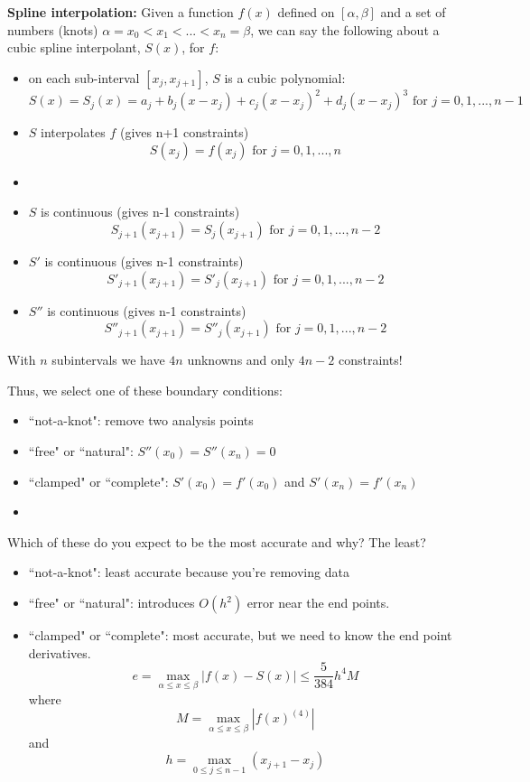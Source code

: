 \documentclass[12pt, answers]{exam}
\begin{document}
\textbf{Spline interpolation:} Given a function $f(x)$ defined on $[\alpha, \beta]$ and a set of numbers (knots) $\alpha=x_0 < x_1 < ... < x_n = \beta$, we can say the following about a cubic spline interpolant, $S(x)$, for $f$:
%
\begin{itemize}
\item on each sub-interval $[x_j, x_{j+1}]$, $S$ is a cubic polynomial:
\[S(x) = S_j(x) = a_j + b_j(x-x_j) + c_j(x-x_j)^2 + d_j(x-x_j)^3 \text{ for } j = 0, 1, ..., n-1\]

\ifprintanswers
\item $S$ interpolates $f$ (gives n+1 constraints)
\[S(x_j) = f(x_j)\text{ for } j = 0, 1, ..., n\]
\else
\item
 \vspace*{3em}
\fi

\item $S$ is continuous (gives n-1 constraints)
\[S_{j+1}(x_{j+1}) = S_{j}(x_{j+1})\text{ for } j = 0, 1, ..., n-2\]

\item $S'$ is continuous (gives n-1 constraints)
\[S'_{j+1}(x_{j+1}) = S'_{j}(x_{j+1})\text{ for } j = 0, 1, ..., n-2\]

\item $S''$ is continuous (gives n-1 constraints)
\[S''_{j+1}(x_{j+1}) = S''_{j}(x_{j+1})\text{ for } j = 0, 1, ..., n-2\]
\end{itemize}
%
With $n$ subintervals we have $4n$ unknowns and only $4n-2$ constraints!

Thus, we select one of these boundary conditions:
\begin{itemize}
\item ``not-a-knot": remove two analysis points
\item ``free" or ``natural": $S''(x_0) = S''(x_n) = 0$ 
\ifprintanswers
\item ``clamped" or ``complete": $S'(x_0) = f'(x_0)$ and $S'(x_n) = f'(x_n)$ 
\else
\item
\fi
\end{itemize}

Which of these do you expect to be the most accurate and why? The least?
\begin{itemize}
\item ``not-a-knot": least accurate because you're removing data
\item ``free" or ``natural": introduces $O(h^2)$ error near the end points.
\item ``clamped" or ``complete": most accurate, but we need to know the end point derivatives.
\[e = \max_{\alpha \leq x \leq \beta} |f(x) - S(x)| \leq \frac{5}{384}h^4 M\]
where
\[M = \max_{\alpha \leq x \leq \beta} |f(x)^{(4)}|\]
and
\[h = \max_{0 \leq j \leq n-1} (x_{j+1} - x_{j})\]
\end{itemize}
\end{document}

